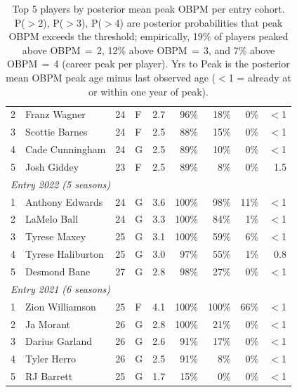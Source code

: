\begin{table}[htbp]
\begin{tabular}{rlrlrrrrr}
    2 & Franz Wagner & 24 & F & 2.7 & 96\% & 18\% & 0\% & $<$1 \\
    3 & Scottie Barnes & 24 & F & 2.5 & 88\% & 15\% & 0\% & $<$1 \\
    4 & Cade Cunningham & 24 & G & 2.5 & 89\% & 10\% & 0\% & $<$1 \\
    5 & Josh Giddey & 23 & F & 2.5 & 89\% & 8\% & 0\% & 1.5 \\
    \midrule[0.4pt]
    \multicolumn{9}{l}{\textit{Entry 2022 (5 seasons)}} \\
    \midrule
    1 & Anthony Edwards & 24 & G & 3.6 & 100\% & 98\% & 11\% & $<$1 \\
    2 & LaMelo Ball & 24 & G & 3.3 & 100\% & 84\% & 1\% & $<$1 \\
    3 & Tyrese Maxey & 25 & G & 3.1 & 100\% & 59\% & 6\% & $<$1 \\
    4 & Tyrese Haliburton & 25 & G & 3.0 & 97\% & 55\% & 1\% & 0.8 \\
    5 & Desmond Bane & 27 & G & 2.8 & 98\% & 27\% & 0\% & $<$1 \\
    \midrule[0.4pt]
    \multicolumn{9}{l}{\textit{Entry 2021 (6 seasons)}} \\
    \midrule
    1 & Zion Williamson & 25 & F & 4.1 & 100\% & 100\% & 66\% & $<$1 \\
    2 & Ja Morant & 26 & G & 2.8 & 100\% & 21\% & 0\% & $<$1 \\
    3 & Darius Garland & 26 & G & 2.6 & 91\% & 17\% & 0\% & $<$1 \\
    4 & Tyler Herro & 26 & G & 2.5 & 91\% & 8\% & 0\% & $<$1 \\
    5 & RJ Barrett & 25 & G & 1.7 & 15\% & 0\% & 0\% & $<$1 \\
    \bottomrule
  \end{tabular}
  \caption{Top 5 players by posterior mean peak OBPM per entry cohort. P($>$2), P($>$3), P($>$4) are posterior probabilities that peak OBPM exceeds the threshold; empirically, 19\% of players peaked above OBPM\,$=$\,2, 12\% above OBPM\,$=$\,3, and 7\% above OBPM\,$=$\,4 (career peak per player). Yrs to Peak is the posterior mean OBPM peak age minus last observed age ($<$1 = already at or within one year of peak).}
  \label{tab:breakout_cohort}
\end{table}

